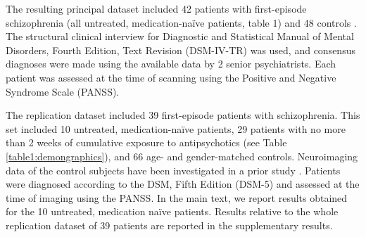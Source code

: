 \begin{refsection}
The resulting principal dataset included 42 patients with first-episode schizophrenia (all untreated, medication-na\"{i}ve patients, table 1) and 48 controls \citep{Cui2017AberrantPA,Cui2018DiseaseDF}. The structural clinical interview for Diagnostic and Statistical Manual of Mental Disorders, Fourth Edition, Text Revision (DSM-IV-TR) was used, and consensus diagnoses were made using the available data by 2 senior psychiatrists. Each patient was assessed at the time of scanning using the Positive and Negative Syndrome Scale (PANSS).

The replication dataset included 39 first-episode patients with schizophrenia. This set included 10 untreated, medication-na\"{i}ve patients, 29 patients with no more than 2 weeks of cumulative exposure to antipsychotics (see Table \ref{table1:demongraphics}), and 66 age- and gender-matched controls. Neuroimaging data of the control subjects have been investigated in a prior study \citep{Cui2018DiseaseDF}. Patients were diagnosed according to the DSM, Fifth Edition (DSM-5) and assessed at the time of imaging using the PANSS. In the main text, we report results obtained for the 10 untreated, medication na\"{i}ve patients. Results relative to the whole replication dataset of 39 patients are reported in the supplementary results.


\end{refsection}
